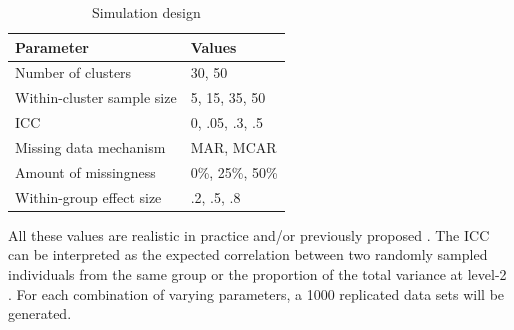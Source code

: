 \documentclass[10pt, a4paper, titlepage]{article}
\begin{document}
\begin{table}[h]
\centering
\caption{Simulation design}
\label{tab:simulationparameters}
\begin{tabular}{l|l}
\textbf{Parameter}              & \textbf{Values} \\ \hline
Number of clusters              & 30, 50          \\
Within-cluster sample size      & 5, 15, 35, 50   \\
ICC                             & 0, .05, .3, .5  \\
Missing data mechanism          & MAR, MCAR       \\
Amount of missingness           & 0\%, 25\%, 50\% \\
Within-group effect size        & .2, .5, .8
\end{tabular}
\end{table}

All these values are realistic in practice and/or previously proposed \citep{gulliford1999, murray2003, hox2017, grund2018, enders2018a, enders2020}. The ICC can be interpreted as the expected correlation between two randomly sampled individuals from the same group or the proportion of the total variance at level-2 \citep{gulliford2005, shieh2012, hox2011}. For each combination of varying parameters, a 1000 replicated data sets will be generated.
\end{document}
